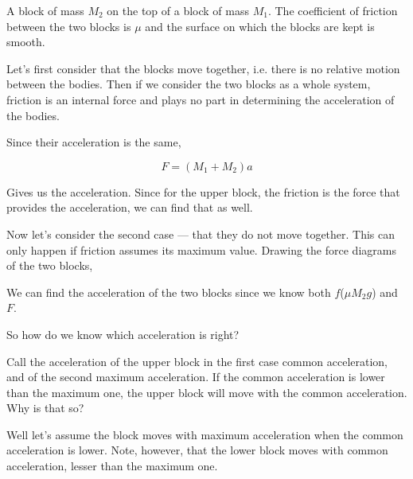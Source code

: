 \begin{marginfigure}
    \vspace{-3.5em}
    \caption{A block of mass \(M_2\) on the top of a block of mass \(M_1\).
    The coefficient of friction between the two blocks is \(\mu\) and the surface on which
    the blocks are kept is smooth.}
    \label{fig: friction with blocks1}
\end{marginfigure}

Let's first consider that the blocks move together, i.e. there is no relative motion 
between the bodies. Then if we consider the two blocks as a whole system,
friction is an internal force and plays no part in determining the acceleration of the bodies.

Since their acceleration is the same, 

\begin{equation*}
    F = (M_1 + M_2)a
\end{equation*}

Gives us the acceleration. Since for the upper block, the friction is the force 
that provides the acceleration, we can find that as well.

\begin{marginfigure}
\end{marginfigure}

Now let's consider the second case --- that they do not move together. This can only happen 
if friction assumes its maximum value. Drawing the force diagrams of the two blocks,

We can find the acceleration of the two blocks since we know both \(f\)(\(\mu M_2g\)) 
and \(F\).

So how do we know which acceleration is right?

Call the acceleration of the upper block in the first case common acceleration, and of the second maximum acceleration.
If the common acceleration is lower than the maximum one, the upper block will move 
with the common acceleration. Why is that so?

\begin{marginfigure}
\end{marginfigure}

Well let's assume the block moves with maximum acceleration when the common acceleration is lower.
Note, however, that the lower block moves with common acceleration, lesser than the maximum one.

